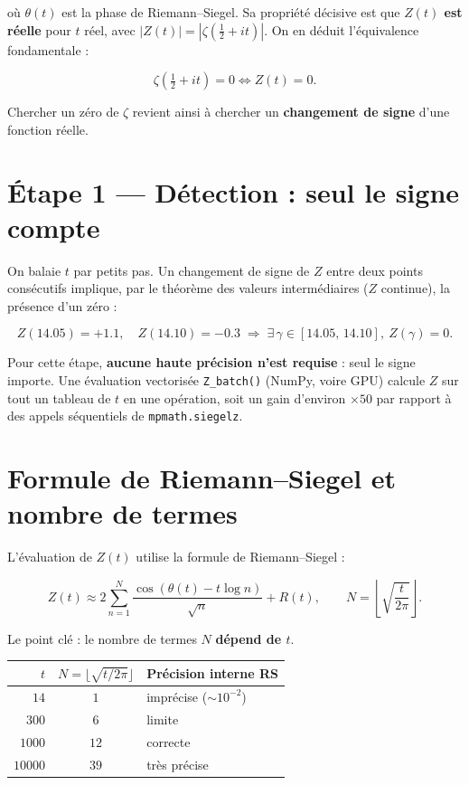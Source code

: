 \documentclass[11pt,a4paper]{article}
\begin{document}
où $\theta(t)$ est la phase de Riemann--Siegel. Sa propriété décisive est que
\textbf{$Z(t)$ est réelle} pour $t$ réel, avec $|Z(t)| = \left|\zeta\left(\tfrac{1}{2}+it\right)\right|$.
On en déduit l'équivalence fondamentale :

\[
\zeta\left(\tfrac{1}{2}+it\right) = 0 \iff Z(t) = 0 .
\]

Chercher un zéro de $\zeta$ revient ainsi à chercher un \textbf{changement de signe}
d'une fonction réelle.

\section{Étape 1 --- Détection : seul le signe compte}

On balaie $t$ par petits pas. Un changement de signe de $Z$ entre deux points consécutifs
implique, par le théorème des valeurs intermédiaires ($Z$ continue), la présence d'un zéro :

\[
Z(14.05) = +1.1, \quad Z(14.10) = -0.3
\;\Longrightarrow\; \exists\, \gamma \in [14.05,\,14.10],\ Z(\gamma)=0 .
\]

Pour cette étape, \textbf{aucune haute précision n'est requise} : seul le signe importe.
Une évaluation vectorisée \texttt{Z\_batch()} (NumPy, voire GPU) calcule $Z$ sur tout un
tableau de $t$ en une opération, soit un gain d'environ $\times 50$ par rapport à des appels
séquentiels de \texttt{mpmath.siegelz}.

\section{Formule de Riemann--Siegel et nombre de termes}

L'évaluation de $Z(t)$ utilise la formule de Riemann--Siegel :

\[
Z(t) \approx 2\sum_{n=1}^{N}\frac{\cos\left(\theta(t)-t\log n\right)}{\sqrt{n}} + R(t),
\qquad
N = \left\lfloor \sqrt{\frac{t}{2\pi}} \right\rfloor .
\]

Le point clé : le nombre de termes $N$ \textbf{dépend de $t$}.

\begin{center}
\begin{tabular}{rcl}
\toprule
$t$ & $N=\lfloor\sqrt{t/2\pi}\rfloor$ & Précision interne RS \\
\midrule
$14$    & $1$  & imprécise ($\sim 10^{-2}$) \\
$300$   & $6$  & limite \\
$1000$  & $12$ & correcte \\
$10000$ & $39$ & très précise \\
\bottomrule
\end{tabular}
\end{center}
\end{document}
